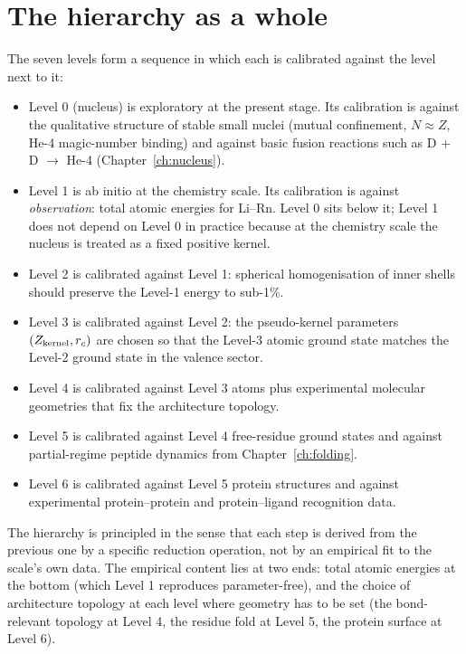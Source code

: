 \section{The hierarchy as a whole}

The seven levels form a sequence in which each is calibrated against the level next to it:
\begin{itemize}
\item Level 0 (nucleus) is exploratory at the present stage. Its calibration is against the qualitative structure of stable small nuclei (mutual confinement, $N \approx Z$, He-4 magic-number binding) and against basic fusion reactions such as D + D $\to$ He-4 (Chapter~\ref{ch:nucleus}).
\item Level 1 is ab initio at the chemistry scale. Its calibration is against \emph{observation}: total atomic energies for Li--Rn. Level 0 sits below it; Level 1 does not depend on Level 0 in practice because at the chemistry scale the nucleus is treated as a fixed positive kernel.
\item Level 2 is calibrated against Level 1: spherical homogenisation of inner shells should preserve the Level-1 energy to sub-1\%.
\item Level 3 is calibrated against Level 2: the pseudo-kernel parameters $(Z_{\rm kernel}, r_c)$ are chosen so that the Level-3 atomic ground state matches the Level-2 ground state in the valence sector.
\item Level 4 is calibrated against Level 3 atoms plus experimental molecular geometries that fix the architecture topology.
\item Level 5 is calibrated against Level 4 free-residue ground states and against partial-regime peptide dynamics from Chapter~\ref{ch:folding}.
\item Level 6 is calibrated against Level 5 protein structures and against experimental protein--protein and protein--ligand recognition data.
\end{itemize}
The hierarchy is principled in the sense that each step is derived from the previous one by a specific reduction operation, not by an empirical fit to the scale's own data. The empirical content lies at two ends: total atomic energies at the bottom (which Level 1 reproduces parameter-free), and the choice of architecture topology at each level where geometry has to be set (the bond-relevant topology at Level 4, the residue fold at Level 5, the protein surface at Level 6).

